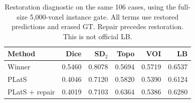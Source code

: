\begin{table}[t]
\centering
\small
\setlength{\tabcolsep}{3pt}
\begin{tabular}{lrrrrr}
\toprule
Method & Dice & SD$_2$ & Topo & VOI & LB \\
\midrule
Winner & 0.5460 & 0.8078 & 0.5694 & 0.5719 & 0.6537 \\
PLatS & 0.4046 & 0.7120 & 0.5820 & 0.5390 & 0.6124 \\
PLatS + repair & 0.4019 & 0.7103 & 0.6364 & 0.5386 & 0.6280 \\
\bottomrule
\end{tabular}
\caption{Restoration diagnostic on the same 106 cases, using the full-size 5,000-voxel instance gate. All terms use restored predictions and erased GT. Repair precedes restoration. This is not official LB.}
\label{tab:modified}
\end{table}

